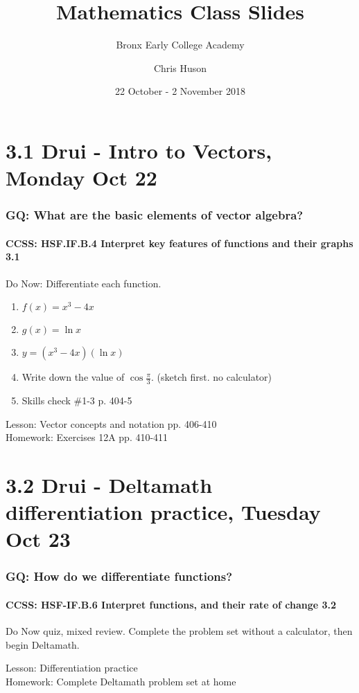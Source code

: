 \documentclass{beamer}
\title{Mathematics Class Slides}
\subtitle{Bronx Early College Academy}
\author{Chris Huson}
\date{22 October - 2 November 2018}
\begin{document}
\frame{\titlepage}

\section[Outline]{}
\frame{\tableofcontents}


\section{3.1 Drui - Intro to Vectors, Monday Oct 22}
  \frame
  {
    \frametitle{GQ: What are the basic elements of vector algebra?}
    \framesubtitle{CCSS: HSF.IF.B.4 Interpret key features of functions and their graphs \qquad \alert{3.1}}

    \begin{block}{Do Now: Differentiate each function.}
    \begin{enumerate}
        \item $f(x)=x^3-4x$
        \item $g(x)=\ln x$
        \item $y=(x^3-4x)(\ln x)$
        \item Write down the value of $\displaystyle \cos \frac{\pi}{3}$. (sketch first. no calculator)
        \item Skills check \#1-3 p. 404-5
    \end{enumerate}
    \end{block}
    Lesson: Vector concepts and notation pp. 406-410\\ \bigskip
    Homework: Exercises 12A pp. 410-411
  }

\section{3.2 Drui - Deltamath differentiation practice, Tuesday Oct 23}
  \frame
  {
    \frametitle{GQ: How do we differentiate functions?}
    \framesubtitle{CCSS: HSF-IF.B.6 Interpret functions, and their rate of change  \alert{3.2}}

    \begin{block}{Do Now quiz, mixed review.}
      Complete the problem set without a calculator, then begin Deltamath.
    \end{block} \bigskip

    Lesson: Differentiation practice \\ \bigskip
    Homework: Complete Deltamath problem set at home
  }
\end{document}
